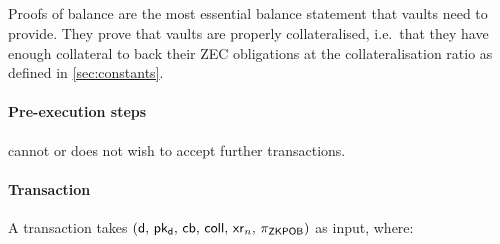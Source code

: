 \subsection{\submitPOBop}
Proofs of balance are the most essential balance statement that vaults need to provide.
They prove that vaults are properly collateralised, i.e.\ that they have enough collateral to back their ZEC obligations at the collateralisation ratio \sstd as defined in \cref{sec:constants}.

\paragraph{Pre-execution steps}
\vault cannot or does not wish to accept further \lock transactions.

\paragraph{Transaction}
A \submitPOB transaction takes $(\mathsf{d},\, \mathsf{pk_d},\, \mathsf{cb},\, \mathsf{coll},\, \mathsf{xr}_n,\, \pi_{\mathsf{ZKPOB}})$ as input, where:
